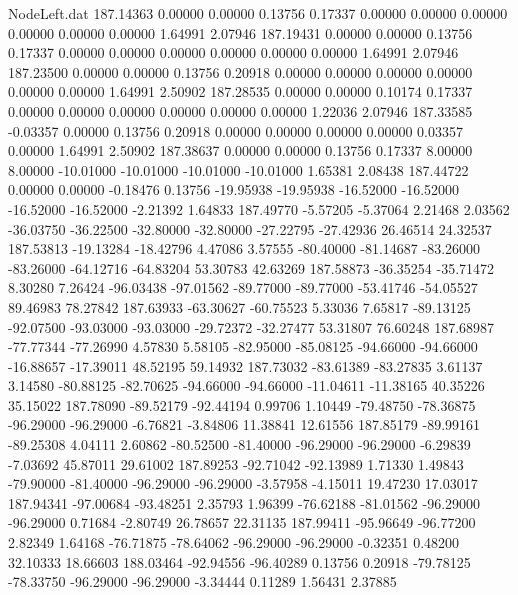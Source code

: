 \begin{filecontents}{NodeLeft.dat}
 187.14363    0.00000    0.00000     0.13756    0.17337    0.00000    0.00000    0.00000    0.00000    0.00000    0.00000    1.64991    2.07946
 187.19431    0.00000    0.00000     0.13756    0.17337    0.00000    0.00000    0.00000    0.00000    0.00000    0.00000    1.64991    2.07946
 187.23500    0.00000    0.00000     0.13756    0.20918    0.00000    0.00000    0.00000    0.00000    0.00000    0.00000    1.64991    2.50902
 187.28535    0.00000    0.00000     0.10174    0.17337    0.00000    0.00000    0.00000    0.00000    0.00000    0.00000    1.22036    2.07946
 187.33585   -0.03357    0.00000     0.13756    0.20918    0.00000    0.00000    0.00000    0.00000    0.03357    0.00000    1.64991    2.50902
 187.38637    0.00000    0.00000     0.13756    0.17337    8.00000    8.00000  -10.01000  -10.01000  -10.01000  -10.01000    1.65381    2.08438
 187.44722    0.00000    0.00000    -0.18476    0.13756  -19.95938  -19.95938  -16.52000  -16.52000  -16.52000  -16.52000   -2.21392    1.64833
 187.49770   -5.57205   -5.37064     2.21468    2.03562  -36.03750  -36.22500  -32.80000  -32.80000  -27.22795  -27.42936   26.46514   24.32537
 187.53813  -19.13284  -18.42796     4.47086    3.57555  -80.40000  -81.14687  -83.26000  -83.26000  -64.12716  -64.83204   53.30783   42.63269
 187.58873  -36.35254  -35.71472     8.30280    7.26424  -96.03438  -97.01562  -89.77000  -89.77000  -53.41746  -54.05527   89.46983   78.27842
 187.63933  -63.30627  -60.75523     5.33036    7.65817  -89.13125  -92.07500  -93.03000  -93.03000  -29.72372  -32.27477   53.31807   76.60248
 187.68987  -77.77344  -77.26990     4.57830    5.58105  -82.95000  -85.08125  -94.66000  -94.66000  -16.88657  -17.39011   48.52195   59.14932
 187.73032  -83.61389  -83.27835     3.61137    3.14580  -80.88125  -82.70625  -94.66000  -94.66000  -11.04611  -11.38165   40.35226   35.15022
 187.78090  -89.52179  -92.44194     0.99706    1.10449  -79.48750  -78.36875  -96.29000  -96.29000   -6.76821   -3.84806   11.38841   12.61556
 187.85179  -89.99161  -89.25308     4.04111    2.60862  -80.52500  -81.40000  -96.29000  -96.29000   -6.29839   -7.03692   45.87011   29.61002
 187.89253  -92.71042  -92.13989     1.71330    1.49843  -79.90000  -81.40000  -96.29000  -96.29000   -3.57958   -4.15011   19.47230   17.03017
 187.94341  -97.00684  -93.48251     2.35793    1.96399  -76.62188  -81.01562  -96.29000  -96.29000    0.71684   -2.80749   26.78657   22.31135
 187.99411  -95.96649  -96.77200     2.82349    1.64168  -76.71875  -78.64062  -96.29000  -96.29000   -0.32351    0.48200   32.10333   18.66603
 188.03464  -92.94556  -96.40289     0.13756    0.20918  -79.78125  -78.33750  -96.29000  -96.29000   -3.34444    0.11289    1.56431    2.37885

\end{filecontents}
